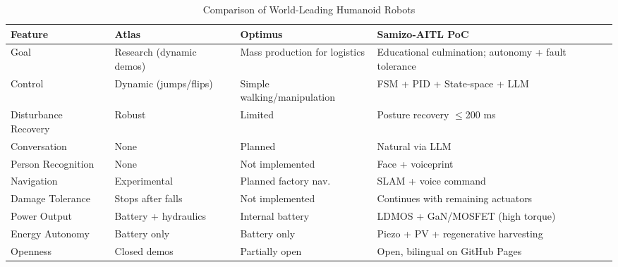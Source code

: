 \begin{table}[t]
\caption{Comparison of World-Leading Humanoid Robots}
\label{tab:humanoid_comparison}
\centering
\renewcommand{\arraystretch}{1.2}
\begin{tabular}{p{2.1cm} p{2.1cm} p{2.1cm} p{2.4cm}}
\toprule
\textbf{Feature} & \textbf{Atlas} & \textbf{Optimus} & \textbf{Samizo-AITL PoC} \\
\midrule
Goal & Research (dynamic demos) & Mass production for logistics & Educational culmination; autonomy + fault tolerance \\
Control & Dynamic (jumps/flips) & Simple walking/manipulation & FSM + PID + State-space + LLM \\
Disturbance Recovery & Robust & Limited & Posture recovery $\leq$200 ms \\
Conversation & None & Planned & Natural via LLM \\
Person Recognition & None & Not implemented & Face + voiceprint \\
Navigation & Experimental & Planned factory nav. & SLAM + voice command \\
Damage Tolerance & Stops after falls & Not implemented & Continues with remaining actuators \\
Power Output & Battery + hydraulics & Internal battery & LDMOS + GaN/MOSFET (high torque) \\
Energy Autonomy & Battery only & Battery only & Piezo + PV + regenerative harvesting \\
Openness & Closed demos & Partially open & Open, bilingual on GitHub Pages \\
\bottomrule
\end{tabular}
\end{table}
